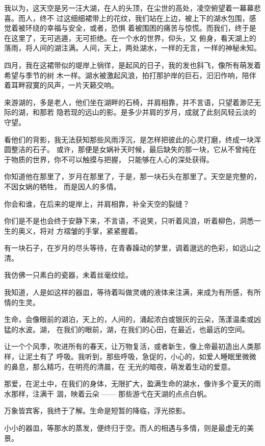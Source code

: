 		我以为，这天空是另一汪大湖，在人的头顶，在尘世的高处，凌空俯望着一幕幕悲喜。而人，终不
	过这细细裙带上的花纹，我们站在上边，被上下的湖水包围，感觉着被环绕的幸福与安全，或者，恐惧
	着被围困的痛苦与惊慌。而我们，终于是在这里了，无可逃遁，无可拒绝。在一个水的世界，仰头，又
	俯身，看天湖上的落雨，将人间的湖注满。人间，天上，两处湖水，一样的无言，一样的神秘未知。

		四月，我在这裙带似的堤岸上徜徉，是起风的日子，我的发也斜飞，像所有萌发着希望与季节的树
	木一样。湖水被激起风浪，拍打那护岸的巨石，汩汩作响，陪伴着耳畔寂寞的风声，一片天籁交响。

		来游湖的，多是老人，他们坐在湖畔的石椅，并肩相靠，并不言语，只望着渺茫无际的湖，和那若
	隐若现的远山的影。是多少并肩的岁月，成就了此刻风轻云淡的守望。

		看他们的背影，我无法获知那些风雨浮沉，是怎样把彼此的心灵打磨，终成一块浑圆整洁的石子。
	或许，那便是女娲补天时候，最后缺失的那一块，它从不曾纯在于物质的世界，你不可以触摸与把握，
	只能够在人心的深处获得。

		你知道他在那里了，岁月在那里了，于是，那一块石头在那里了。天空是完整的，不因女娲的牺牲，
	而是因人的多情。

		你会和谁，在后来的堤岸上，并肩相靠，补全天空的裂缝？

		你们是不是也会终于安静下来，不言语，不说笑，只听着风浪，听着柳色，洞悉一生的奥义，将对
	方褶皱的手掌，紧紧握着。

		有一块石子，在岁月的尽头等待，在青春躁动的梦里，调着邈远的色彩，如远山之清。

		我仿佛一只素白的瓷器，未着丝毫纹绘。

		我知道，人是如这样的器皿，等待着叫做灵魂的液体来注满，来成为有所感，有所情的生灵。

		生命，会像眼前的湖泊，天上的，人间的，涌起浓白或银灰的云朵，荡漾温柔或凶猛的水波。湖，
	在我们的眼前，湖，在我们的心田，在最近，也最远的空间。

		让一个个风季，吹进所有的春天，让万物复活，或者新生，像上帝最初造出人类那样，让泥土有了
	呼吸。我听到，那些呼吸，急促的，小心的，如爱人睡眠里微微的鼻息，那么精巧，在明亮的清晨，在
	无光的暗夜，萌发着生动的爱意。

		那爱，在泥土中，在我们的身体，无限扩大，盈满生命的湖水，像许多个夏天的雨水那样，注满干
	涸，映着云朵 —— 那些游弋在天湖的点点白帆。


		万象皆宾客，我终于了解。生命是短暂的降临，浮光掠影。

		小小的器皿，等那水的蒸发，便终归于空。而人的相遇与多情，则是最虚无的美景。

